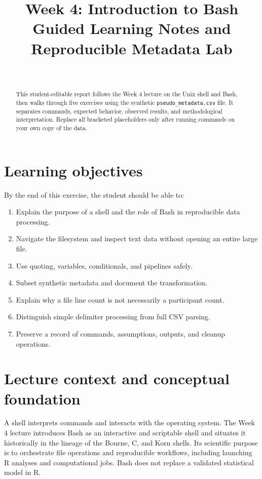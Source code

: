 \documentclass[11pt,letterpaper]{article}
\title{Week 4: Introduction to Bash\\\large Guided Learning Notes and Reproducible Metadata Lab}
\author{\student\\\course}
\date{\reportdate}
\begin{document}
\maketitle
\begin{abstract}
This student-editable report follows the Week 4 lecture on the Unix shell and
Bash, then walks through five exercises using the synthetic
\texttt{pseudo\_metadata.csv} file. It separates commands, expected behavior,
observed results, and methodological interpretation. Replace all bracketed
placeholders only after running commands on your own copy of the data.
\end{abstract}
\tableofcontents
\newpage

\section{Learning objectives}
By the end of this exercise, the student should be able to:
\begin{enumerate}
\item Explain the purpose of a shell and the role of Bash in reproducible data processing.
\item Navigate the filesystem and inspect text data without opening an entire large file.
\item Use quoting, variables, conditionals, and pipelines safely.
\item Subset synthetic metadata and document the transformation.
\item Explain why a file line count is not necessarily a participant count.
\item Distinguish simple delimiter processing from full CSV parsing.
\item Preserve a record of commands, assumptions, outputs, and cleanup operations.
\end{enumerate}

\section{Lecture context and conceptual foundation}
A shell interprets commands and interacts with the operating system. The Week 4
lecture introduces Bash as an interactive and scriptable shell and situates it
historically in the lineage of the Bourne, C, and Korn shells. Its scientific
purpose is to orchestrate file operations and reproducible workflows, including
launching R analyses and computational jobs. Bash does not replace a validated
statistical model in R.
\end{document}
